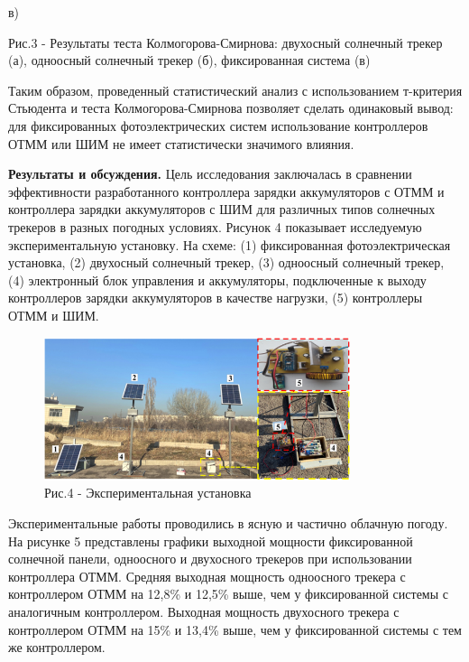 в)

Рис.3 - Результаты теста Колмогорова-Смирнова: двухосный солнечный
трекер (а), одноосный солнечный трекер (б), фиксированная система (в)

\begin{multicols}{2}
Таким образом, проведенный статистический анализ с использованием
т-критерия Стьюдента и теста Колмогорова-Смирнова позволяет сделать
одинаковый вывод: для фиксированных фотоэлектрических систем
использование контроллеров ОТММ или ШИМ не имеет статистически значимого
влияния.

{\bfseries Результаты и обсуждения.} Цель исследования заключалась в
сравнении эффективности разработанного контроллера зарядки аккумуляторов
с ОТММ и контроллера зарядки аккумуляторов с ШИМ для различных типов
солнечных трекеров в разных погодных условиях. Рисунок 4 показывает
исследуемую экспериментальную установку. На схеме: (1) фиксированная
фотоэлектрическая установка, (2) двухосный солнечный трекер, (3)
одноосный солнечный трекер, (4) электронный блок управления и
аккумуляторы, подключенные к выходу контроллеров зарядки аккумуляторов в
качестве нагрузки, (5) контроллеры ОТММ и ШИМ.
\end{multicols}


\begin{figure}[H]
	\centering
	\includegraphics[width=0.8\textwidth]{media/ict/image10}
	\caption*{Рис.4 - Экспериментальная установка}
\end{figure}

\begin{multicols}{2}
Экспериментальные работы проводились в ясную и частично облачную погоду.
На рисунке 5 представлены графики выходной мощности фиксированной
солнечной панели, одноосного и двухосного трекеров при использовании
контроллера ОТММ. Средняя выходная мощность одноосного трекера с
контроллером ОТММ на 12,8\% и 12,5\% выше, чем у фиксированной системы с
аналогичным контроллером. Выходная мощность двухосного трекера с
контроллером ОТММ на 15\% и 13,4\% выше, чем у фиксированной системы с
тем же контроллером.
\end{multicols}

